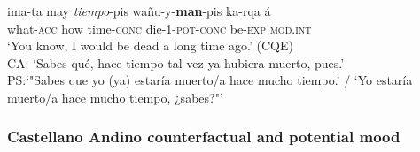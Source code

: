 \documentclass[output=paper,hidelinks]{langscibook}
\begin{document}
\ea \label{ex:tiempo}
\gll ima-ta may \textit{tiempo}-pis wañu-y-\textbf{man}-pis ka-rqa á \\
what-\textsc{acc} how time-\textsc{conc} die-\textsc{1-pot-conc} be-\textsc{exp} \textsc{mod.int} \\ 
\glt ‘You know, I would be dead a long time ago.’ (CQE)\\
CA: `Sabes qué, hace tiempo tal vez ya hubiera muerto, pues.'\\
PS:`"Sabes que yo (ya) estaría muerto/a hace mucho tiempo.' / `Yo estaría muerto/a hace mucho tiempo, ¿sabes?"' \\
\z 

\subsubsection{Castellano Andino counterfactual and potential mood}
\end{document}
